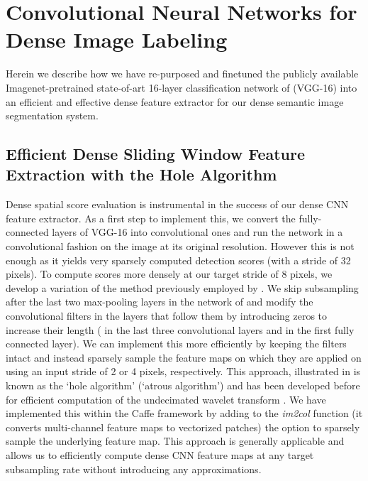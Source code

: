 \section{Convolutional Neural Networks for Dense Image Labeling}
\label{sec:convnets}


Herein we describe how we have re-purposed and finetuned the publicly
available Imagenet-pretrained state-of-art 16-layer classification network of
\cite{simonyan2014very} (VGG-16) into an efficient and effective dense feature
extractor for our dense semantic image segmentation system.

\subsection{Efficient Dense Sliding Window Feature Extraction with the Hole Algorithm}
\label{sec:convnet-hole}

Dense spatial score evaluation is instrumental in the success of our dense CNN
feature extractor. As a first step to implement this, we convert the
fully-connected layers of VGG-16 into convolutional ones and run the network
in a convolutional fashion on the image at its original resolution. However
this is not enough as it yields very sparsely computed detection scores (with
a stride of 32 pixels). To compute scores more densely at our target stride of
8 pixels, we develop a variation of the method previously employed by
\citet{GCMG+13, sermanet2013overfeat}. We skip subsampling after the last two
max-pooling layers in the network of \citet{simonyan2014very} and modify the
convolutional filters in the layers that follow them by introducing zeros to
increase their length ( in the last three convolutional layers and
 in the first fully connected layer). We can implement this more
efficiently by keeping the filters intact and instead sparsely sample the
feature maps on which they are applied on using an input stride of 2 or 4 
pixels, respectively. This approach, illustrated in  is 
known as the `hole algorithm' (`atrous algorithm') and has been developed 
before for efficient computation of the undecimated wavelet transform
\cite{Mall99}. We have implemented this within the Caffe framework
\citep{jia2014caffe} by adding to the \textsl{im2col} function (it converts
multi-channel feature maps to vectorized patches) the option to sparsely
sample the underlying feature map. This approach is generally applicable
and allows us to efficiently compute dense CNN feature maps at any target
subsampling rate without introducing any approximations.

